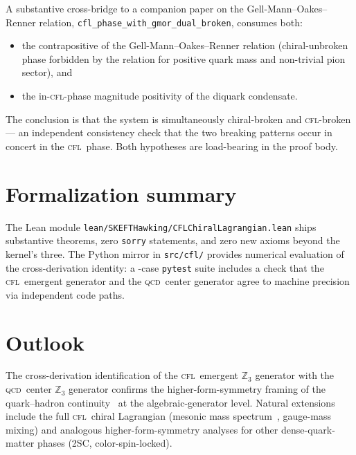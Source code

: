 \documentclass[twocolumn]{revtex4-2}
\newcommand{\CFL}{\textsc{cfl}}
\newcommand{\QCD}{\textsc{qcd}}
\newcommand{\Zthree}{\mathbb{Z}_3}
\begin{document}
A substantive cross-bridge to a companion paper on the
Gell-Mann--Oakes--Renner relation,
\texttt{cfl\_phase\_with\_gmor\_dual\_broken}, consumes both:
\begin{itemize}
\item the contrapositive of the
Gell-Mann--Oakes--Renner relation (chiral-unbroken phase forbidden by
the relation for positive quark mass and non-trivial pion sector), and
\item the in-\CFL-phase magnitude positivity of the diquark
condensate.
\end{itemize}
The conclusion is that the system is simultaneously chiral-broken and
\CFL-broken --- an independent consistency check that the two breaking
patterns occur in concert in the \CFL\ phase. Both hypotheses are
load-bearing in the proof body.

\section{Formalization summary}
\label{sec:formalization}

The Lean module
\texttt{lean/SKEFTHawking/CFLChiralLagrangian.lean} ships \cflThms{}
substantive theorems, zero \texttt{sorry} statements, and zero new
axioms beyond the kernel's three. The Python mirror in
\texttt{src/cfl/} provides numerical evaluation of the cross-derivation
identity: a \cflTests{}-case \texttt{pytest} suite includes a check that the
\CFL\ emergent generator and the \QCD\ center generator agree to
machine precision via independent code paths.

\section{Outlook}
\label{sec:outlook}

The cross-derivation identification of the \CFL\ emergent $\Zthree$
generator with the \QCD\ center $\Zthree$ generator confirms the
higher-form-symmetry framing of the
quark--hadron continuity~\cite{HironoTanizaki2018,SchaeferWilczek1999}
at the algebraic-generator level. Natural extensions include the full
\CFL\ chiral Lagrangian (mesonic mass spectrum~\cite{SonStephanov2001},
gauge-mass mixing) and analogous higher-form-symmetry analyses for
other dense-quark-matter phases (2SC, color-spin-locked).
\end{document}
